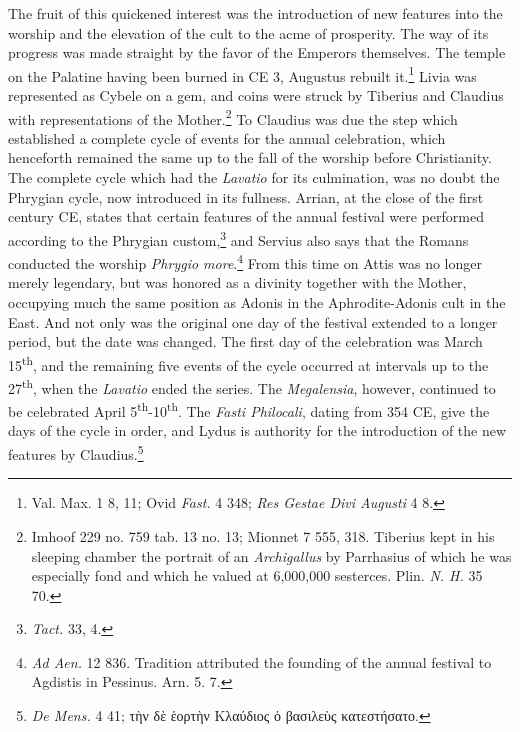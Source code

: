 \documentclass[a4paper, 11pt, oneside, polutonikogreek, french]{article}
\begin{document}
The fruit of this quickened interest was the introduction of new features into the worship and the elevation of the cult to the acme of prosperity. The way of its progress was made straight by the favor of the Emperors themselves. The temple on the Palatine having been burned in \textsc{CE} 3, Augustus rebuilt it.\footnote{Val. Max. 1 8, 11; Ovid \emph{Fast.} 4 348; \emph{Res Gestae Divi Augusti} 4 8.} Livia was represented as Cybele on a gem, and coins were struck by Tiberius and Claudius with representations of the Mother.\footnote{Imhoof 229 no. 759 tab. 13 no. 13; Mionnet 7 555, 318. Tiberius kept in his sleeping chamber the portrait of an \emph{Archigallus} by Parrhasius of which he was especially fond and which he valued at 6,000,000 sesterces. Plin. \emph{N. H.} 35 70.} To Claudius was due the step which established a complete cycle of events for the annual celebration, which henceforth remained the same up to the fall of the worship before Christianity. The complete cycle which had the \emph{Lavatio} for its culmination, was no doubt the Phrygian cycle, now introduced in its fullness. Arrian, at the close of the first century \textsc{CE}, states that certain features of the annual festival were performed according to the Phrygian custom,\footnote{\emph{Tact.} 33, 4.} and Servius also says that the Romans conducted the worship \emph{Phrygio more}.\footnote{\emph{Ad Aen.} 12 836. Tradition attributed the founding of the annual festival to Agdistis in Pessinus. Arn. 5. 7.} From this time on Attis was no longer merely legendary, but was honored as a divinity together with the Mother, occupying much the same position as Adonis in the Aphrodite-Adonis cult in the East. And not only was the original one day of the festival extended to a longer period, but the date was changed. The first day of the celebration was March 15\textsuperscript{th}, and the remaining five events of the cycle occurred at intervals up to the 27\textsuperscript{th}, when the \emph{Lavatio} ended the series. The \emph{Megalensia}, however, continued to be celebrated April 5\textsuperscript{th}-10\textsuperscript{th}. The \emph{Fasti Philocali}, dating from 354 \textsc{CE}, give the days of the cycle in order, and Lydus is authority for the introduction of the new features by Claudius.\footnote{\emph{De Mens.} 4 41; τὴν δὲ ἑορτὴν Κλαύδιος ὁ βασιλεὺς κατεστήσατο.}
\end{document}
